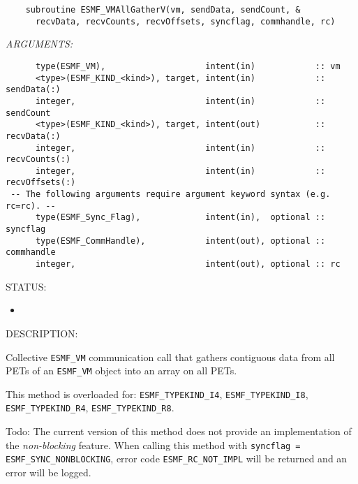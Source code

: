   
\begin{verbatim}    subroutine ESMF_VMAllGatherV(vm, sendData, sendCount, &
      recvData, recvCounts, recvOffsets, syncflag, commhandle, rc)\end{verbatim}{\em ARGUMENTS:}
\begin{verbatim}      type(ESMF_VM),                    intent(in)            :: vm
      <type>(ESMF_KIND_<kind>), target, intent(in)            :: sendData(:)
      integer,                          intent(in)            :: sendCount
      <type>(ESMF_KIND_<kind>), target, intent(out)           :: recvData(:)
      integer,                          intent(in)            :: recvCounts(:)
      integer,                          intent(in)            :: recvOffsets(:)
 -- The following arguments require argument keyword syntax (e.g. rc=rc). --
      type(ESMF_Sync_Flag),             intent(in),  optional :: syncflag
      type(ESMF_CommHandle),            intent(out), optional :: commhandle
      integer,                          intent(out), optional :: rc\end{verbatim}
{\sf STATUS:}
   \begin{itemize}
   \item{}
   \end{itemize}
  
{\sf DESCRIPTION:\\ }


     Collective {\tt ESMF\_VM} communication call that gathers contiguous data 
     from all PETs of an {\tt ESMF\_VM} object into an array on all PETs.
  
     This method is overloaded for:
     {\tt ESMF\_TYPEKIND\_I4}, {\tt ESMF\_TYPEKIND\_I8},
     {\tt ESMF\_TYPEKIND\_R4}, {\tt ESMF\_TYPEKIND\_R8}.
  
     {\sc Todo:} The current version of this method does not provide an 
     implementation of the {\em non-blocking} feature. When calling this 
     method with {\tt syncflag = ESMF\_SYNC\_NONBLOCKING}, error code 
     {\tt ESMF\_RC\_NOT\_IMPL} will be returned and an error will be 
     logged.
  
